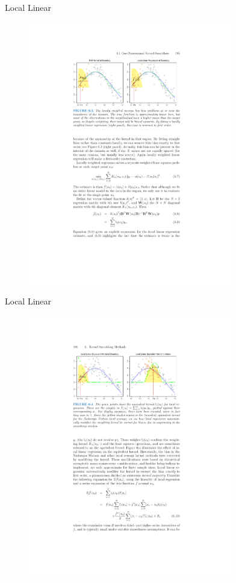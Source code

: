  \begin{frame}{Local Linear}
\begin{figure}[htbp]
\begin{center}
\includegraphics[width=3.5in]{./resources/nwloclinear.pdf}
\label{loclinear1}
\end{center}
\end{figure}
\end{frame}

 \begin{frame}{Local Linear}
\begin{figure}[htbp]
\begin{center}
\includegraphics[width=3.5in]{./resources/nwloclinear2.pdf}
\label{loclinear2}
\end{center}
\end{figure}
\end{frame}


